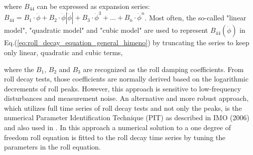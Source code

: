 where $B_{44}$ can be expressed as expansion series:  
$ B_{44} = B_1\cdot\dot{\phi} + B_2\cdot\dot{\phi}\left|\dot{\phi}\right| + B_3\cdot\dot{\phi}^3 + ... + B_n\cdot\dot{\phi}^n$. Most often, the so-called "linear model", "quadratic model" and "cubic model" are used to represent $B_{44}(\dot{\phi})$ in Eq.(\ref{eq:roll_decay_equation_general_himeno}) by truncating the series to keep only linear, quadratic and cubic terms,






where the $B_1$, $B_2$ and $B_3$ are recognized as the roll damping coefficients.
From roll decay tests, those coefficients are normally derived based on the logarithmic decrements of roll peaks. However, this approach is sensitive to low-frequency disturbances and measurement noise. An alternative and more robust approach, which utilizes full time series of roll decay tests and not only the peaks, is the numerical Parameter Identification Technique (PIT) as described in IMO (2006) and also used in \parencite{bulian_simplified_2004}. In this approach a numerical solution to a one degree of freedom roll equation is fitted to the roll decay time series by tuning the parameters in the roll equation.



%